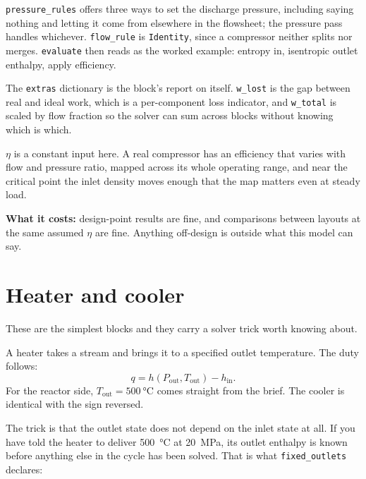 \documentclass[11pt,a4paper]{report}
\newcommand{\code}[1]{\texttt{\small #1}}
\begin{document}

\noindent \code{pressure\_rules} offers three ways to set the discharge
pressure, including saying nothing and letting it come from elsewhere in the
flowsheet; the pressure pass handles whichever. \code{flow\_rule} is
\code{Identity}, since a compressor neither splits nor merges. \code{evaluate}
then reads as the worked example: entropy in, isentropic outlet enthalpy,
apply efficiency.

The \code{extras} dictionary is the block's report on itself. \code{w\_lost}
is the gap between real and ideal work, which is a per-component loss
indicator, and \code{w\_total} is scaled by flow fraction so the solver can
sum across blocks without knowing which is which.

\begin{caveat}[title={Caveat: one efficiency number is standing in for a machine}]
$\eta$ is a constant input here. A real compressor has an efficiency that
varies with flow and pressure ratio, mapped across its whole operating
range, and near the critical point the inlet density moves enough that the
map matters even at steady load.

\textbf{What it costs:} design-point results are fine, and comparisons
between layouts at the same assumed $\eta$ are fine. Anything off-design is
outside what this model can say.
\end{caveat}

\section{Heater and cooler}

These are the simplest blocks and they carry a solver trick worth knowing
about.

A heater takes a stream and brings it to a specified outlet temperature. The
duty follows:
\[
  q = h(P_{\text{out}}, T_{\text{out}}) - h_{\text{in}}.
\]
For the reactor side, $T_{\text{out}} = \SI{500}{\celsius}$ comes straight
from the brief. The cooler is identical with the sign reversed.

The trick is that the outlet state does not depend on the inlet state at
all. If you have told the heater to deliver \SI{500}{\celsius} at
\SI{20}{\mega\pascal}, its outlet enthalpy is known before anything else in
the cycle has been solved. That is what \code{fixed\_outlets} declares:

\end{document}
